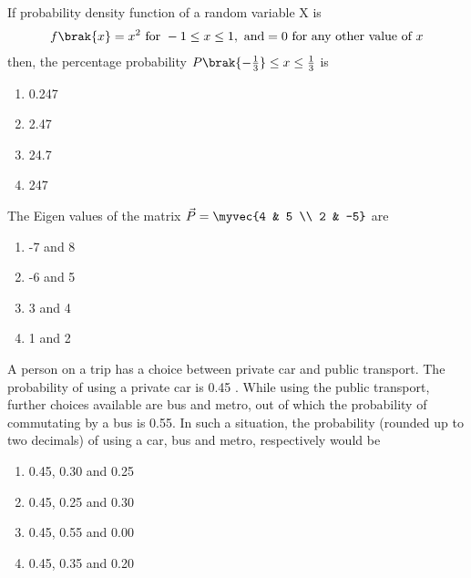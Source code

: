 \item If probability density function of a random variable X is 
\begin{align*}
    f\brak{x} = x^2 \text{ for } -1 \leq x \leq 1, \text{ and}
     = 0 \text{ for any other value of $x$}
\end{align*}
then, the percentage probability $P\brak{-\frac{1}{3}} \leq x \leq \frac{1}{3}$ is
\begin{multicols}{2}
    \begin{enumerate}
        \item 0.247
        \item 2.47
        \item 24.7
        \item 247
    \end{enumerate}
\end{multicols}

\item The Eigen values of the matrix $\vec{P} = \myvec{4 & 5 \\ 2 & -5}$ are
\begin{multicols}{2}
    \begin{enumerate}
        \item -7 and 8
        \item -6 and 5
        \item 3 and 4
        \item 1 and 2
    \end{enumerate}
\end{multicols}

\item A person on a trip has a choice between private car and public transport. The probability of using a private car is 0.45 . While using the public transport, further choices available are bus and metro, out of which the probability of commutating by a bus is 0.55. In such a situation, the probability (rounded up to two decimals) of using a car, bus and metro, respectively would be
\begin{multicols}{2}
    \begin{enumerate}
        \item 0.45, 0.30 and 0.25
        \item 0.45, 0.25 and 0.30
        \item 0.45, 0.55 and 0.00
        \item 0.45, 0.35 and 0.20
    \end{enumerate}
\end{multicols}

